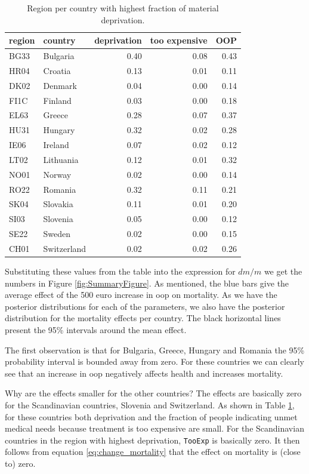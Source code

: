 \documentclass[a4paper,12pt]{article}
\begin{document}
\begin{table}[htbp]
\caption{\label{tab:region_per_country}Region per country with highest fraction of material deprivation.}
\centering
\begin{tabular}{llrrr}
region & country & deprivation & too expensive & OOP\\
\hline
BG33 & Bulgaria & 0.40 & 0.08 & 0.43\\
HR04 & Croatia & 0.13 & 0.01 & 0.11\\
DK02 & Denmark & 0.04 & 0.00 & 0.14\\
FI1C & Finland & 0.03 & 0.00 & 0.18\\
EL63 & Greece & 0.28 & 0.07 & 0.37\\
HU31 & Hungary & 0.32 & 0.02 & 0.28\\
IE06 & Ireland & 0.07 & 0.02 & 0.12\\
LT02 & Lithuania & 0.12 & 0.01 & 0.32\\
NO01 & Norway & 0.02 & 0.00 & 0.14\\
RO22 & Romania & 0.32 & 0.11 & 0.21\\
SK04 & Slovakia & 0.11 & 0.01 & 0.20\\
SI03 & Slovenia & 0.05 & 0.00 & 0.12\\
SE22 & Sweden & 0.02 & 0.00 & 0.15\\
CH01 & Switzerland & 0.02 & 0.02 & 0.26\\
\end{tabular}
\end{table}

Substituting these values from the table into the expression for \(dm/m\) we get the numbers in Figure \ref{fig:SummaryFigure}. As mentioned, the blue bars give the average effect of the 500 euro increase in oop on mortality. As we have the posterior distributions for each of the parameters, we also have the posterior distribution for the mortality effects per country. The black horizontal lines present the 95\% intervals around the mean effect. 

The first observation is that for Bulgaria, Greece, Hungary and Romania the 95\% probability interval is bounded away from zero. For these countries we can clearly see that an increase in oop negatively affects health and increases mortality. 

Why are the effects smaller for the other countries? The effects are basically zero for the Scandinavian countries, Slovenia and Switzerland. As shown in Table \ref{tab:region_per_country}, for these countries both deprivation and the fraction of people indicating unmet medical needs because treatment is too expensive are small. For the Scandinavian countries in the region with highest deprivation, \texttt{TooExp} is basically zero. It then follows from equation \eqref{eq:change_mortality} that the effect on mortality is (close to) zero.
\end{document}
